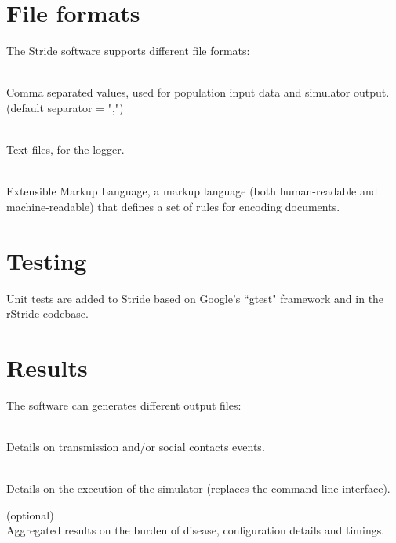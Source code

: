 \section{File formats}
\label{section:FileFormats}

The Stride software supports different file formats:
\begin{compactdesc}
	\item [CSV] \ \\
	Comma separated values, used for population input data and simulator output. (default separator = ",")
	\item [TXT] \ \\
	Text files, for the logger.
	\item [XML] \ \\
	Extensible Markup Language, a markup language (both human-readable and machine-readable) that defines a set of rules for encoding documents.
\end{compactdesc}


%
\section{Testing}
Unit tests are added to Stride based on Google's ``gtest" framework and in the rStride codebase.

\section{Results}
\label{section:Results}

The software can generates different output files:
\begin{compactdesc}
	\item [event\_log.txt] \ \\
	Details on transmission and/or social contacts events.
	\item [stride\_log.txt] \ \\
	Details on the execution of the simulator (replaces the command line interface).
	\item [summary.csv] (optional) \ \\
	Aggregated results on the burden of disease, configuration details and timings.

\end{compactdesc}


